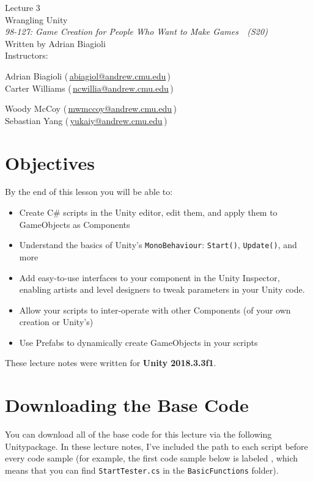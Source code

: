\documentclass[11pt]{article}
\makeatletter
\newcommand{\lecturenum}{3}
\newcommand{\lecturename}{Wrangling Unity}
\newcommand{\authorname}{Adrian Biagioli}
\newcommand{\coursenum}{98-127}
\newcommand{\coursename}{Game Creation for People Who Want to Make Games}
\newcommand{\coursesem}{S20}
\newcommand{\instructors}{\begin{minipage}[t]{0.4\columnwidth}\centering Adrian Biagioli (\,\href{mailto:abiagiol@andrew.cmu.edu}{abiagiol@andrew.cmu.edu}\,) \\ Carter Williams (\,\href{mailto:ncwillia@andrew.cmu.edu}{ncwillia@andrew.cmu.edu}\,)\end{minipage}
\begin{minipage}[t]{0.4\columnwidth}\centering Woody McCoy (\,\href{mailto:mwmccoy@andrew.cmu.edu}{mwmccoy@andrew.cmu.edu}\,) \\ Sebastian Yang (\,\href{mailto:yukaiy@andrew.cmu.edu}{yukaiy@andrew.cmu.edu}\,)\end{minipage}}
\makeatother
\begin{document}
\thispagestyle{plain}
{
    \vspace{1.5em}
    \begin{center}
    {
        \huge
        Lecture \lecturenum \\
        \vspace{0.5em}
        \lecturename
        \vspace{0.4em}
    } \\
    {
        \it
        \coursenum: \coursename\ \ (\coursesem)
    } \\
    \vspace{1.0em}
    Written by \authorname \\
    \vspace{0.7em}
    Instructors:\\ \instructors
    \end{center}
}

\section{Objectives}

By the end of this lesson you will be able to:
\begin{itemize}
    \item Create C\# scripts in the Unity editor, edit them, and apply them to GameObjects as Components
    \item Understand the basics of Unity's \lstinline|MonoBehaviour|: \lstinline|Start()|, 
          \lstinline|Update()|, and more
    \item Add easy-to-use interfaces to your component in the Unity Inspector, enabling artists and
          level designers to tweak parameters in your Unity code.
    \item Allow your scripts to inter-operate with other Components (of your own creation or 
          Unity's)
    \item Use Prefabs to dynamically create GameObjects in your scripts
\end{itemize}

\noindent These lecture notes were written for {\bf Unity 2018.3.3f1}.

\section{Downloading the Base Code}

You can download all of the base code for this lecture via the following Unitypackage.  In these 
lecture notes, I've included the path to each script before every code sample (for example, the 
first code sample below is labeled , which means that you 
can find \lstinline|StartTester.cs| in the \lstinline|BasicFunctions| folder).
\end{document}
